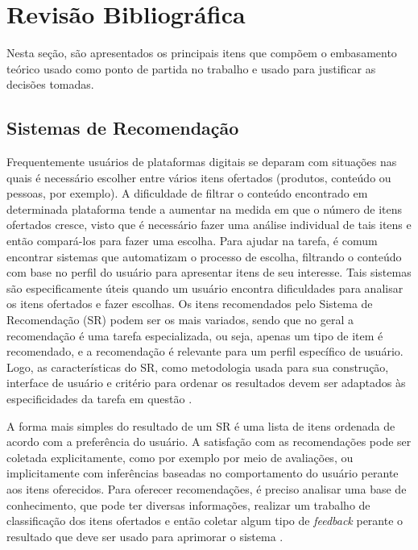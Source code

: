 \documentclass[12pt]{article}
\begin{document}
\section{Revisão Bibliográfica}

Nesta seção, são apresentados os principais itens que compõem o embasamento teórico usado como ponto de partida no trabalho e usado para justificar as decisões tomadas.

\subsection{Sistemas de Recomendação}

Frequentemente usuários de plataformas digitais se deparam com situações nas quais é necessário escolher entre vários itens ofertados (produtos, conteúdo ou pessoas, por exemplo). A dificuldade de filtrar o conteúdo encontrado em determinada plataforma tende a aumentar na medida em que o número de itens ofertados cresce, visto que é necessário fazer uma análise individual de tais itens e então compará-los para fazer uma escolha. Para ajudar na tarefa, é comum encontrar sistemas que automatizam o processo de escolha, filtrando o conteúdo com base no perfil do usuário para apresentar itens de seu interesse. Tais sistemas são especificamente úteis quando um usuário encontra dificuldades para analisar os itens ofertados e fazer escolhas. Os itens recomendados pelo Sistema de Recomendação (SR) podem ser os mais variados, sendo que no geral a recomendação é uma tarefa especializada, ou seja, apenas um tipo de item é recomendado, e a recomendação é relevante para um perfil específico de usuário. Logo, as características do SR, como metodologia usada para sua construção, interface de usuário e critério para ordenar os resultados devem ser adaptados às especificidades da tarefa em questão \cite{ricci2011introduction}. 

A forma mais simples do resultado de um SR é uma lista de itens ordenada de acordo com a preferência do usuário. A satisfação com as recomendações pode ser coletada explicitamente, como por exemplo por meio de avaliações, ou implicitamente com inferências baseadas no comportamento do usuário perante aos itens oferecidos. Para oferecer recomendações, é preciso analisar 
uma base de conhecimento, que pode ter diversas informações, realizar um trabalho de classificação dos itens ofertados e então coletar algum tipo de \textit{feedback} perante o resultado que deve ser usado para aprimorar o sistema \cite{shani2011evaluating}.
\end{document}
